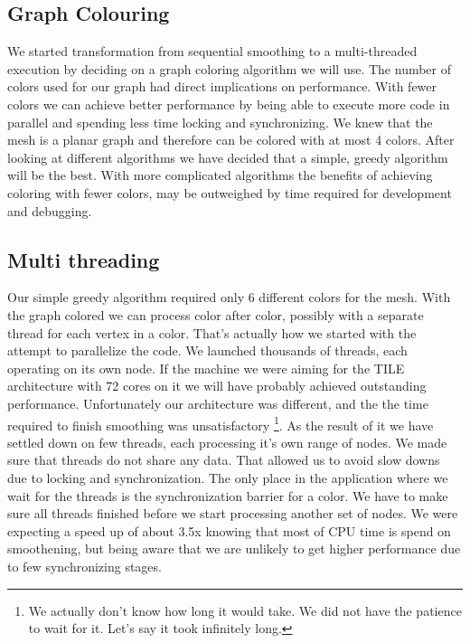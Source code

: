 \documentclass[conference]{IEEEtran}
\begin{document}
\subsection{Graph Colouring}
We started transformation from sequential smoothing to a multi-threaded execution by deciding on a graph coloring algorithm we will use. The number of colors used for our graph had direct implications on performance. With fewer colors we can achieve better performance by being able to execute more code in parallel and spending less time locking and synchronizing. We knew that the mesh is a planar graph and therefore can be colored with at most 4 colors. After looking at different algorithms we have decided that a simple, greedy algorithm will be the best. With more complicated algorithms the benefits of achieving coloring with fewer colors, may be outweighed by time required for development and debugging.

\subsection{Multi threading}
Our simple greedy algorithm required only 6 different colors for the mesh. With the graph colored we can process color after color, possibly with a separate thread for each vertex in a color. That's actually how we started with the attempt to parallelize the code. We launched thousands of threads, each operating on its own node. If the machine we were aiming for the TILE architecture with 72 cores on it we will have probably achieved outstanding performance. Unfortunately our architecture was different, and the the time required to finish smoothing was unsatisfactory \footnote{We actually don't know how long it would take. We did not have the patience to wait for it. Let's say it took infinitely long.}. As the result of it we have settled down on few threads, each processing it's own range of nodes. We made sure that threads do not share any data. That allowed us to avoid slow downs due to locking and synchronization. The only place in the application where we wait for the threads is the synchronization barrier for a color. We have to make sure all threads finished before we start processing another set of nodes. We were expecting a speed up of about 3.5x knowing that most of CPU time is spend on smoothening, but being aware that we are unlikely to get higher performance due to few synchronizing stages.
\end{document}
